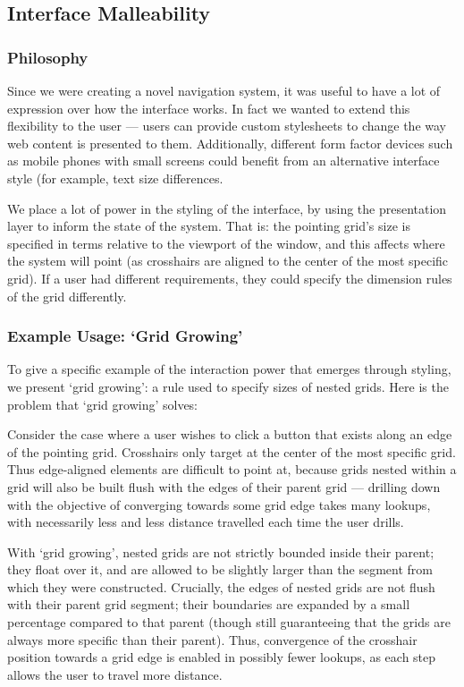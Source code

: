 \documentclass[11pt,openright,a4paper]{report}
\begin{document}
\subsection{Interface Malleability}
\subsubsection{Philosophy}
Since we were creating a novel navigation system, it was useful to have a lot of expression over how the interface works. In fact we wanted to extend this flexibility to the user --- users can provide custom stylesheets\cite{stylebot} to change the way web content is presented to them. Additionally, different form factor devices such as mobile phones with small screens could benefit from an alternative interface style (for example, text size differences.

We place a lot of power in the styling of the interface, by using the presentation layer to inform the state of the system. That is: the pointing grid's size is specified in terms relative to the viewport of the window, and this affects where the system will point (as crosshairs are aligned to the center of the most specific grid). If a user had different requirements, they could specify the dimension rules of the grid differently.

\subsubsection{Example Usage: `Grid Growing'}
To give a specific example of the interaction power that emerges through styling, we present `grid growing': a rule used to specify sizes of nested grids. Here is the problem that `grid growing' solves:

Consider the case where a user wishes to click a button that exists along an edge of the pointing grid. Crosshairs only target at the center of the most specific grid. Thus edge-aligned elements are difficult to point at, because grids nested within a grid will also be built flush with the edges of their parent grid --- drilling down with the objective of converging towards some grid edge takes many lookups, with necessarily less and less distance travelled each time the user drills.

With `grid growing', nested grids are not strictly bounded inside their parent; they float over it, and are allowed to be slightly larger than the segment from which they were constructed. Crucially, the edges of nested grids are not flush with their parent grid segment; their boundaries are expanded by a small percentage compared to that parent (though still guaranteeing that the grids are always more specific than their parent). Thus, convergence of the crosshair position towards a grid edge is enabled in possibly fewer lookups, as each step allows the user to travel more distance.
\end{document}
